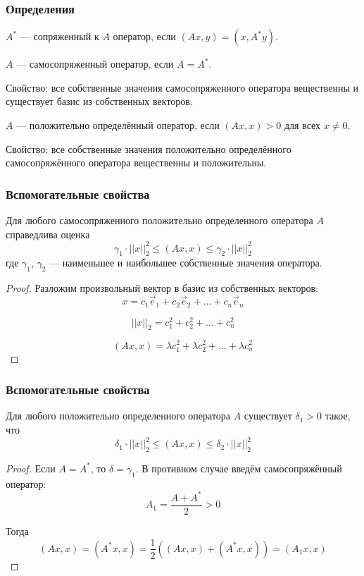 \documentclass[10pt]{beamer}
\begin{document}
\begin{frame}[fragile]
\frametitle{Определения}

\vfill
$A^*$ --- сопряженный к $A$ оператор, если $(Ax, y) = (x, A^* y)$.

\vfill
$A$ --- самосопряженный оператор, если $A = A^*$.

Свойство: все собственные значения самосопряженного оператора вещественны и существует базис из собственных векторов.

\vfill

$A$ --- положительно определённый оператор, если $(A x, x) > 0$ для всех $x \neq 0$.

Свойство: все собственные значения положительно определённого самосопряжённого оператора вещественны и положительны.

\end{frame}


\begin{frame}[fragile]
\frametitle{Вспомогательные свойства}

\begin{theorem}[1]
Для любого самосопряженного положительно определенного оператора $A$ справедлива оценка
$$ \gamma_1 \cdot ||x||_2^2 \leqslant (Ax, x) \leqslant \gamma_2 \cdot ||x||_2^2 $$
где $\gamma_1$, $\gamma_2$ --- наименьшее и наибольшее собственные значения оператора.

\end{theorem}

\begin{proof}

Разложим произвольный вектор в базис из собственных векторов:
$$x = c_1 \vec{e}_1 + c_2 \vec{e}_2 + \ldots + c_n \vec{e}_n$$

$$||x||_2 = c_1^2 + c_2^2 + \ldots + c_n^2$$

$$(Ax, x) = \lambda c_1^2 + \lambda c_2^2 + \ldots + \lambda c_n^2$$

\end{proof}

\end{frame}


\begin{frame}[fragile]
\frametitle{Вспомогательные свойства}

\begin{theorem}[2]
Для любого положительно определенного оператора $A$ существует $\delta_1 > 0$ такое, что
$$\delta_1 \cdot ||x||_2^2 \leqslant (Ax, x) \leqslant \delta_2 \cdot ||x||_2^2$$

\end{theorem}

\begin{proof}

Если $A = A^*$, то $\delta = \gamma_1$. В противном случае введём самосопряжённый оператор:
$$ 
A_1 = \frac{A + A^*}{2} > 0 
$$

Тогда 
$$(A x, x) = (A^* x, x) = \frac12 ( (A x, x) + (A^* x, x) ) = (A_1 x, x)$$

\end{proof}

\end{frame}
\end{document}

